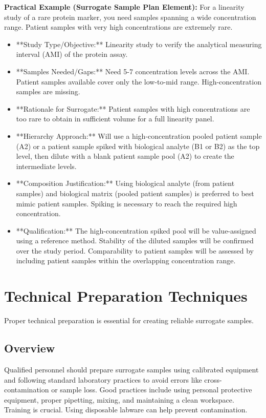 \documentclass{article}
\begin{document}
\textbf{Practical Example (Surrogate Sample Plan Element):}
For a linearity study of a rare protein marker, you need samples spanning a wide concentration range. Patient samples with very high concentrations are extremely rare.
\begin{itemize}
    \item **Study Type/Objective:** Linearity study to verify the analytical measuring interval (AMI) of the protein assay.
    \item **Samples Needed/Gaps:** Need 5-7 concentration levels across the AMI. Patient samples available cover only the low-to-mid range. High-concentration samples are missing.
    \item **Rationale for Surrogate:** Patient samples with high concentrations are too rare to obtain in sufficient volume for a full linearity panel.
    \item **Hierarchy Approach:** Will use a high-concentration pooled patient sample (A2) or a patient sample spiked with biological analyte (B1 or B2) as the top level, then dilute with a blank patient sample pool (A2) to create the intermediate levels.
    \item **Composition Justification:** Using biological analyte (from patient samples) and biological matrix (pooled patient samples) is preferred to best mimic patient samples. Spiking is necessary to reach the required high concentration.
    \item **Qualification:** The high-concentration spiked pool will be value-assigned using a reference method. Stability of the diluted samples will be confirmed over the study period. Comparability to patient samples will be assessed by including patient samples within the overlapping concentration range.
\end{itemize}

\section{Technical Preparation Techniques}

Proper technical preparation is essential for creating reliable surrogate samples.

\subsection{Overview}

Qualified personnel should prepare surrogate samples using calibrated equipment and following standard laboratory practices to avoid errors like cross-contamination or sample loss. Good practices include using personal protective equipment, proper pipetting, mixing, and maintaining a clean workspace. Training is crucial. Using disposable labware can help prevent contamination.
\end{document}
